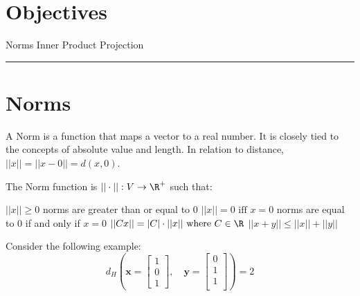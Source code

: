 
\section*{Objectives}
\begin{outline}
    \1 Norms
    \1 Inner Product
    \1 Projection
\end{outline}

\rule[0.0051in]{\textwidth}{0.00025in}
\section{Norms}

A Norm is a function that maps a vector to a real number. It is closely tied to the concepts of absolute value and length. In relation to distance, $||x|| = ||x - 0|| = d(x,0)$. 

The Norm function is $||\cdot|| : V \rightarrow \R^{+}$ such that:

\begin{outline}[enumerate]
	\1 $||x|| \ge 0$    norms are greater than or equal to 0
	\1 $||x|| = 0 \text{ iff } x = 0$    norms are equal to 0 if and only if $x = 0$
	\1 $||Cx|| = |C| \cdot ||x|| \text{ where } C \in \R$
	\1 $||x+y|| \leq ||x|| + ||y||$
\end{outline}


Consider the following example:
\[
d_H \left( \mathbf{{x}} = 
\begin{bmatrix}
    1 \\
    0 \\
    1 
\end{bmatrix}, 
\quad
\mathbf{{y}} = 
\begin{bmatrix}
    0 \\
    1 \\
    1 \\
\end{bmatrix} \right) = 2
\]

